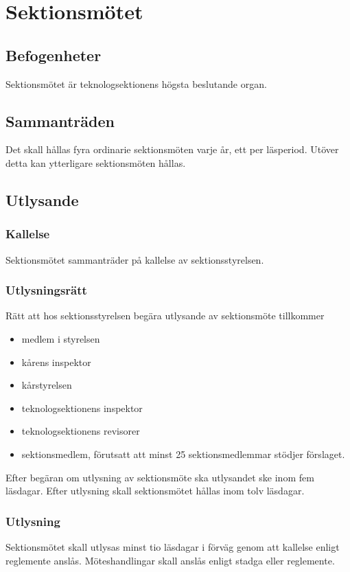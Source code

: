 \section{Sektionsmötet}

\subsection{Befogenheter}
Sektionsmötet är teknologsektionens högsta beslutande organ.

\subsection{Sammanträden}
Det skall hållas fyra ordinarie sektionsmöten varje år, ett per läsperiod. 
Utöver detta kan ytterligare sektionsmöten hållas.

\subsection{Utlysande}
\label{sec:utlysande}

\subsubsection{Kallelse}
Sektionsmötet sammanträder på kallelse av sektionsstyrelsen.

\subsubsection{Utlysningsrätt}
Rätt att hos sektionsstyrelsen begära utlysande av sektionsmöte tillkommer

\begin{itemize}
	\item medlem i styrelsen
	\item kårens inspektor
	\item kårstyrelsen
	\item teknologsektionens inspektor
	\item teknologsektionens revisorer
	\item sektionsmedlem, förutsatt att minst 25 sektionsmedlemmar stödjer förslaget.
\end{itemize}

Efter begäran om utlysning av sektionsmöte ska utlysandet ske inom fem läsdagar. 
Efter utlysning skall sektionsmötet hållas inom tolv läsdagar.

\subsubsection{Utlysning}
Sektionsmötet skall utlysas minst tio läsdagar i förväg genom att kallelse enligt reglemente anslås. Möteshandlingar skall anslås enligt stadga eller reglemente.

